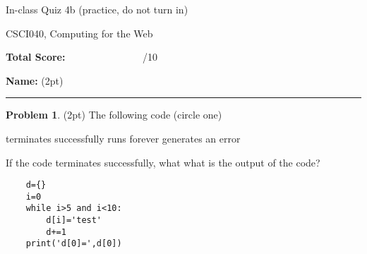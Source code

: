 \documentclass[10pt]{article}
\theoremstyle{definition}
\newtheorem{problem}{Problem}
\begin{document}
\begin{center}
    {
\Large
In-class Quiz 4b (practice, do not turn in)
}

    \vspace{0.1in}
CSCI040, Computing for the Web

    \vspace{0.1in}
\end{center}

\vspace{0.25in}
\noindent
\textbf{Total Score:} ~~~~~~~~~~~~~~~/10

\vspace{0.5in}
\noindent
\textbf{Name:} (2pt)

\noindent
\rule{\textwidth}{0.1pt}
\vspace{0.25in}

\begin{problem}
    (2pt)
    The following code (circle one)
    
    \vspace{0.25in}
    \hspace{0.5in}terminates successfully
    \hspace{1in}runs forever
    \hspace{1in}generates an error
    \vspace{0.25in}

    \noindent
    If the code terminates successfully, what what is the output of the code?
\end{problem}
\begin{lstlisting}
    d={}
    i=0
    while i>5 and i<10:
        d[i]='test'
        d+=1
    print('d[0]=',d[0])
\end{lstlisting}
\vspace{1.5in}
\end{document}
